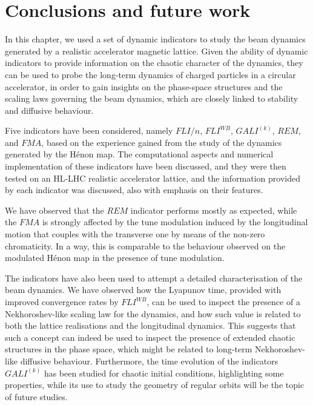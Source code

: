 \section{Conclusions and future work}\label{sec:8:conclusions}

In this chapter, we used a set of dynamic indicators to study the beam dynamics generated by a realistic accelerator magnetic lattice. Given the ability of dynamic indicators to provide information on the chaotic character of the dynamics, they can be used to probe the long-term dynamics of charged particles in a circular accelerator, in order to gain insights on the phase-space structures and the scaling laws governing the beam dynamics, which are closely linked to stability and diffusive behaviour.


Five indicators have been considered, namely $FLI/n$, $FLI^{WB}$, $GALI^{(k)}$, $REM$, and $FMA$, based on the experience gained from the study of the dynamics generated by the H\'enon map. The computational aspects and numerical implementation of these indicators have been discussed, and they were then tested on an HL-LHC realistic accelerator lattice, and the information provided by each indicator was discussed, also with emphasis on their features.

We have observed that the $REM$ indicator performs mostly as expected, while the $FMA$ is strongly affected by the tune modulation induced by the longitudinal motion that couples with the transverse one by means of the non-zero chromaticity. In a way, this is comparable to the behaviour observed on the modulated Hénon map in the presence of tune modulation. 

The indicators have also been used to attempt a detailed characterisation of the beam dynamics. We have observed how the Lyapunov time, provided with improved convergence rates by $FLI^{WB}$, can be used to inspect the presence of a Nekhoroshev-like scaling law for the dynamics, and how such value is related to both the lattice realisations and the longitudinal dynamics. This suggests that such a concept can indeed be used to inspect the presence of extended chaotic structures in the phase space, which might be related to long-term Nekhoroshev-like diffusive behaviour. Furthermore, the time evolution of the indicators $GALI^{(k)}$ has been studied for chaotic initial conditions, highlighting some properties, while its use to study the geometry of regular orbits will be the topic of future studies.
